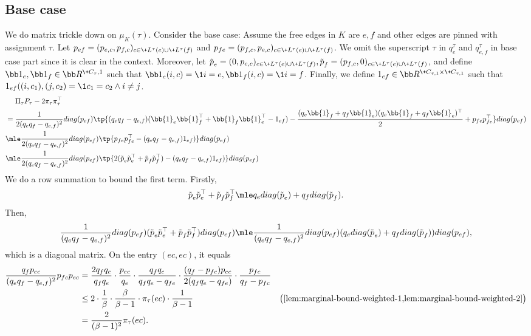 \subsection{Base case}\label{sec:base-case}
\newcommand{\revp}{\tilde{\*p}}
We do matrix trickle down on $\mu_K(\tau)$.
Consider the base case: Assume the free edges in $K$ are $e,f$ and other edges are pinned with assignment $\tau$. 
Let $\*p_{ef}=(p_{e,c},p_{f,c})_{c\in \+L^\tau(e)\cup \+L^\tau(f)}$ and $\*p_{fe}=(p_{f,c},p_{e,c})_{c\in \+L^\tau(e)\cup \+L^\tau(f)}$. We omit the superscript $\tau$ in $q_e^\tau$ and $q_{e,f}^\tau$ in base case part since it is clear in the context.
Moreover, let $\revp_e=(0, p_{e, c})_{c\in \+L^\tau(e)\cup \+L^\tau(f)}, \revp_f = (p_{f, c}, 0)_{c\in \+L^\tau(e)\cup \+L^\tau(f)}$,
and define $\bb 1_e, \bb 1_f\in \bb R^{\+C_\tau, 1}$ such that $\bb 1_e(i, c) = \1{i=e},\bb 1_f(i, c) = \1{i=f}$.
Finally, we define $\*1_{ef}\in \bb R^{\+C_{\tau, 1}\times \+C_{\tau, 1}}$ such that $\*1_{ef}((i, c_1), (j, c_2) = \1{c_1=c_2\wedge i\neq j}$.
\begin{align*}
    &\phantom{{}={}}\Pi_\tau P_\tau- 2\pi_\tau\pi_\tau^\top 
    \\
    &= \frac{1}{2(q_eq_f-q_{e,f})^2}\-{diag}(\*p_{ef})\tp{(q_eq_f-q_{e,f})(\bb{1}_e\bb{1}_f^\top + \bb{1}_f\bb{1}_e^\top-\*1_{ef})-\frac{(q_e\bb{1}_f+q_f\bb{1}_e)(q_e\bb{1}_f+q_f\bb{1}_e)^\top}{2}+\*p_{fe}\*p_{fe}^\top} \-{diag}(\*p_{ef})\\
    &\mle \frac{1}{2(q_eq_f-q_{e,f})^2}\-{diag}(\*p_{ef})\tp{\*p_{fe}\*p_{fe}^\top-(q_eq_f-q_{e,f})\*1_{ef})} \-{diag}(\*p_{ef})\\
    &\mle \frac{1}{2(q_eq_f-q_{e,f})^2}\-{diag}(\*p_{ef})\tp{2(\revp_{e}\revp_{e}^\top+\revp_{f}\revp_{f}^\top)-(q_eq_f-q_{e,f})\*1_{ef})} \-{diag}(\*p_{ef})
\end{align*}
We do a row summation to bound the first term. Firstly,
\begin{align*}
    \revp_{e}\revp_{e}^\top+\revp_{f}\revp_{f}^\top \mle q_e\-{diag}(\revp_e) + q_f\-{diag}(\revp_f).
\end{align*}
Then,
\begin{align*}
    \frac{1}{(q_eq_f-q_{e,f})^2}\-{diag}(\*p_{ef})(\revp_{e}\revp_{e}^\top+\revp_{f}\revp_{f}^\top)\-{diag}(\*p_{ef})
    \mle \frac{1}{(q_eq_f-q_{e,f})^2}\-{diag}(\*p_{ef})(q_e\-{diag}(\revp_e) + q_f\-{diag}(\revp_f))\-{diag}(\*p_{ef}),
\end{align*}
which is a diagonal matrix.
On the entry $(ec, ec)$, it equals
\begin{align*}
    \frac{q_fp_{ec}}{(q_eq_f-q_{e,f})^2}p_{fc}p_{ec}
   &=       \frac{2q_fq_e}{q_fq_e}
      \cdot \frac{p_{ec}}{q_e}
      \cdot \frac{q_fq_e}{q_fq_e-q_{fe}}
      \cdot \frac{(q_f-p_{fc})p_{ec}}{2(q_fq_e-q_{fe})}
      \cdot \frac{p_{fc}}{q_f-p_{fc}}
    \\&\le
            2
      \cdot \frac1\beta
      \cdot \frac{\beta}{\beta-1}
      \cdot \pi_\tau(ec)
      \cdot \frac{1}{\beta-1}
      & \text{\big(\Cref{lem:marginal-bound-weighted-1,lem:marginal-bound-weighted-2}\big)}
    \\&=\frac{2}{(\beta-1)^2}\pi_\tau(ec).
\end{align*}
